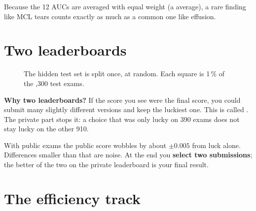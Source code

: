 Because the 12 AUCs are averaged with equal weight (a  average), a rare finding like MCL tears
counts exactly as much as a common one like effusion.

\section{Two leaderboards}

\begin{figure}[H]
\centering
{}
\caption{The hidden test set is split once, at random. Each square is 1\,\% of the ,300 test exams.}
\end{figure}

\begin{why}\textbf{Why two leaderboards?}
If the score you see were the final score, you could submit many slightly different versions and keep the
luckiest one. This is called . The private part stops it: a choice that
was only lucky on 390 exams does not stay lucky on the other 910.
\end{why}

\begin{innumbers}
With  public exams the public score wobbles by about $\pm0.005$ from luck alone. Differences smaller than
that are noise. At the end you \textbf{select two submissions}; the better of the two on the private
leaderboard is your final result.
\end{innumbers}

\section{The efficiency track}

